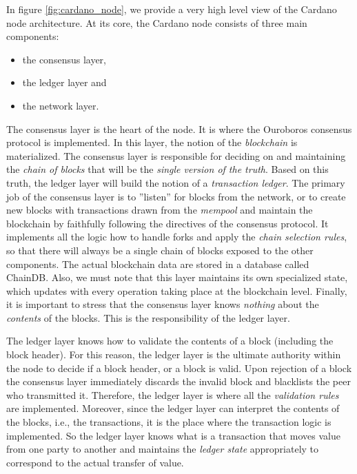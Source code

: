 In figure \ref{fig:cardano_node}, we provide a very high level view of the 
Cardano node architecture. At its core, the Cardano node consists of three main 
components:
\begin{itemize}
	\item the consensus layer,
	\item the ledger layer and
	\item the network layer.
\end{itemize}
The consensus layer is the heart of the node. It is where the Ouroboros 
consensus protocol \cite{C:KRDO17} is implemented. In this layer, the notion of 
the \emph{blockchain} is materialized. The consensus layer is 
responsible for deciding on and maintaining the \emph{chain of blocks} that 
will be the \emph{single version of the truth}. Based on this truth, the ledger 
layer 
will build the notion of a \emph{transaction ledger}. The primary job of the 
consensus layer is to ''listen'' for blocks from the network, or to create new 
blocks with transactions drawn from the \emph{mempool} and maintain the 
blockchain by faithfully following the directives of the consensus protocol. It 
implements all the logic how to handle forks and apply the \emph{chain 
	selection 
	rules}, so 
that there will always be a single chain of blocks exposed to the other 
components. The actual blockchain data are stored in a database called ChainDB. 
Also, we must note that this layer maintains its own specialized state, which 
updates with every operation taking place at the blockchain level.
Finally, it is important to stress that the consensus layer knows 
\emph{nothing} about the 
\emph{contents} of the blocks. This is the responsibility of the ledger layer.

The ledger layer knows how to validate the contents of a block (including the 
block 
header). For this reason, the ledger layer is the ultimate authority within the 
node to decide if a block header, or a block is valid. Upon rejection 
of 
a block the consensus layer immediately discards the invalid 
block and blacklists the peer who transmitted it. Therefore, the ledger layer 
is where all the \emph{validation rules} are implemented. Moreover, since the 
ledger layer can interpret the contents of the blocks, i.e., the transactions, 
it is the place where the transaction logic is implemented. So the ledger layer 
knows what is a transaction that moves value from one party to another and 
maintains the \emph{ledger state} appropriately to correspond to the actual 
transfer of value. 

